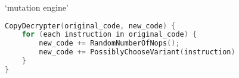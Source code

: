 
\begin{frame}[fragile,label=mutationEngine]{`mutation engine'}
\begin{lstlisting}[language=C++,style=small]
CopyDecrypter(original_code, new_code) {
    for (each instruction in original_code) {
        new_code += RandomNumberOfNops();
        new_code += PossiblyChooseVariant(instruction)
    }
}
\end{lstlisting}
\end{frame}

